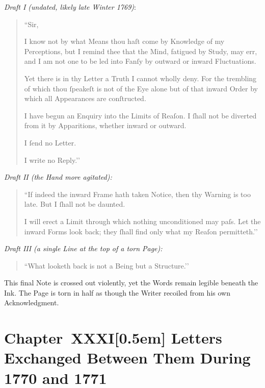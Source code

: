 \documentclass[12pt]{book}
\begin{document}
\medskip

\noindent\textit{Draft I (undated, likely late Winter 1769)}:

\begin{quote}
``Sir,

I know not by what Means thou haſt come by Knowledge of my Perceptions, but I remind thee that the Mind, fatigued by Study, may err, and I am not one to be led into Fanſy by outward or inward Fluctuations.

Yet there is in thy Letter a Truth I cannot wholly deny. For the trembling of which thou ſpeakeſt is not of the Eye alone but of that inward Order by which all Appearances are conſtructed.

I have begun an Enquiry into the Limits of Reaſon. I ſhall not be diverted from it by Apparitions, whether inward or outward.

I ſend no Letter.

I write no Reply.’’
\end{quote}

\medskip

\noindent\textit{Draft II (the Hand more agitated):}

\begin{quote}
``If indeed the inward Frame hath taken Notice, then thy Warning is too late. But I ſhall not be daunted.

I will erect a Limit through which nothing unconditioned may paſs. Let the inward Forms look back; they ſhall find only what my Reaſon permitteth.’’
\end{quote}

\medskip

\noindent\textit{Draft III (a single Line at the top of a torn Page):}

\begin{quote}
``What looketh back is not a Being but a Structure.’’
\end{quote}

This final Note is crossed out violently, yet the Words remain legible beneath the Ink. The Page is torn in half as though the Writer recoiled from his own Acknowledgment.


\chapter*{Chapter~XXXI[0.5em]
Letters Exchanged Between Them During 1770 and 1771}
\end{document}
